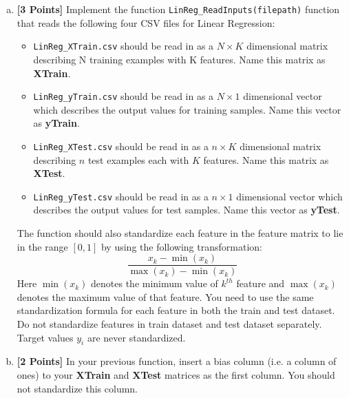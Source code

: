 \documentclass[a4paper]{article}
\theoremstyle{definition}
\newcommand \code [1]{{\tt #1}}
\begin{document}
\begin{enumerate}[(a)]

\item {\bf [3 Points]} %
Implement the function \code{LinReg\_ReadInputs(filepath)} function that reads the following four CSV files for Linear Regression: \begin{itemize}
\item \code{LinReg\_XTrain.csv} should be read in as a $N \times K$ dimensional matrix describing N training examples with K features. Name this matrix as \textbf{XTrain}.
\item\code{LinReg\_yTrain.csv} should be read in as a $N \times 1$ dimensional vector which describes the output values for training samples. Name this vector as \textbf{yTrain}.
\item \code{LinReg\_XTest.csv} should be read in as a $n \times K$ dimensional matrix describing $n$ test examples each with $K$ features. Name this matrix as \textbf{XTest}.
\item \code{LinReg\_yTest.csv} should be read in as a $n \times 1$ dimensional vector which describes the output values for test samples. Name this vector as \textbf{yTest}.
\end{itemize}

The function should also standardize each feature in the feature matrix to lie in the range $[0,1]$ by using the following transformation: $$\frac{x_k - \min (x_k)}{\max (x_k) - \min (x_k)}$$ Here $\min (x_k)$ denotes the minimum value of $k^{th}$ feature and $\max (x_k)$ denotes the maximum value of that feature. You need to use the same standardization formula for each feature in both the train and test dataset. Do not standardize features in train dataset and test dataset separately. Target values $y_i$ are never standardized.\\

\item {\bf [2 Points]} In your previous function, insert a bias column (i.e. a column of ones) to your \textbf{XTrain} and \textbf{XTest} matrices as the first column. You should not standardize this column. \\


\end{enumerate}
\end{document}
